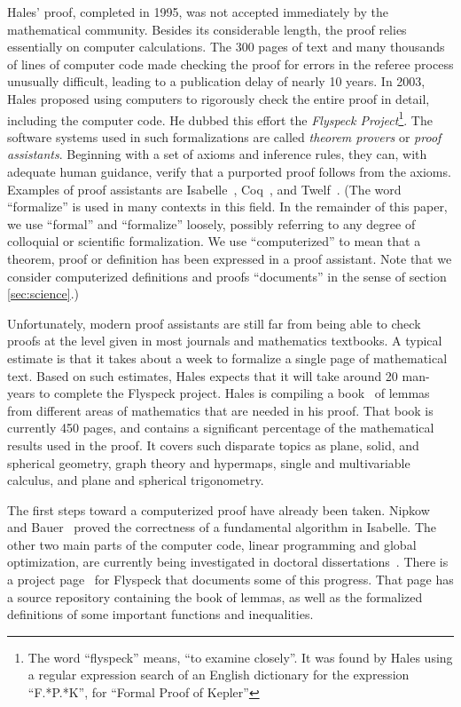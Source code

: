 Hales' proof, completed in 1995, was not accepted immediately by the
mathematical community.  Besides its considerable length, the proof relies
essentially on computer calculations.  The 300 pages of text and many thousands
of lines of computer code made checking the proof for errors in the referee
process unusually difficult, leading to a publication delay of nearly 10 years.
In 2003, Hales proposed using computers to rigorously check the entire proof in
detail, including the computer code.  He dubbed this effort the \textit{Flyspeck
  Project}\footnote{The word ``flyspeck'' means, ``to examine closely''.  It was
  found by Hales using a regular expression search of an English dictionary for
  the expression ``F.*P.*K'', for ``Formal Proof of Kepler''}.  The software
systems used in such formalizations are called \textit{theorem provers} or
\textit{proof assistants}.  Beginning with a set of axioms and inference rules,
they can, with adequate human guidance, verify that a purported proof follows
from the axioms.  Examples of proof assistants are
Isabelle~\cite{Paulson:1994:Isabelle}, Coq~\cite{Bertot:2004:CoqBook}, and
Twelf~\cite{Schurmann:1999:Twelf}. (The word ``formalize'' is used in many
contexts in this field.  In the remainder of this paper, we use ``formal'' and
``formalize'' loosely, possibly referring to any degree of colloquial or
scientific formalization.  We use ``computerized'' to mean that a theorem,
proof or definition has been expressed in a proof assistant.  Note that we
consider computerized definitions and proofs ``documents'' in the sense of
section \ref{sec:science}.)

  Unfortunately, modern proof assistants are still far from being able to check
proofs at the level given in most journals and mathematics textbooks.  A typical
estimate is that it takes about a week to formalize a single page of mathematical
text.  Based on such estimates, Hales expects that it will take 
around 20 man-years to complete the Flyspeck project.  
Hales is compiling a book~\cite{Hales:2007:FlyspeckBook}
of lemmas from different areas of mathematics that are needed in his proof. 
That book is currently 450 pages, and contains a significant percentage
of the mathematical results used in the proof.  It covers such disparate topics
as plane, solid, and spherical geometry, graph theory and hypermaps, single and
multivariable calculus, and plane and spherical trigonometry.

The first steps toward a computerized proof have already been taken.
Nipkow and Bauer~\cite{Nipkow:2005:Tame} proved the correctness of a
fundamental algorithm in Isabelle.  The other two main parts of the
computer code, linear programming and global optimization, are
currently being investigated in doctoral
dissertations~\cite{Zumkeller:2006:TaylorModels,Obua:2005:LinearPrograms}.
There is a project page~\cite{website:FlyspeckProjectPage} for Flyspeck
that documents some of this progress.  That page has a source
repository containing the book of lemmas, as well as the formalized
definitions of some important functions and inequalities.  

